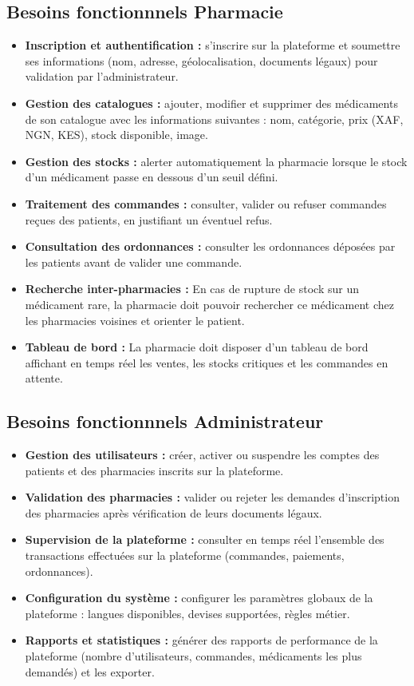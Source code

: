 \documentclass[12pt,a4paper]{report}
\begin{document}
	\subsection{Besoins fonctionnnels Pharmacie} 
	\begin{itemize} 
		\item \textbf{Inscription et authentification : } s'inscrire sur la plateforme et soumettre ses informations (nom, adresse, géolocalisation, documents légaux) pour validation par l'administrateur. 
		\item \textbf{Gestion des catalogues : }ajouter, modifier et supprimer des médicaments de son catalogue avec les informations suivantes : nom, catégorie, prix (XAF, NGN, KES), stock disponible, image. 
		\item \textbf{Gestion des stocks : }alerter automatiquement la pharmacie lorsque le stock d'un médicament passe en dessous d'un seuil défini. 
		\item \textbf{Traitement des commandes : }consulter, valider ou refuser commandes reçues des patients, en justifiant un éventuel refus. 
		\item \textbf{Consultation des ordonnances : }consulter les ordonnances déposées par les patients avant de valider une commande. 
		\item \textbf{Recherche inter-pharmacies : }En cas de rupture de stock sur un médicament rare, la pharmacie doit pouvoir rechercher ce médicament chez les pharmacies voisines et orienter le patient. 
		\item \textbf{Tableau de bord : }La pharmacie doit disposer d'un tableau de bord affichant en temps réel les ventes, les stocks critiques et les commandes en attente. 
	\end{itemize} 
	
	\subsection{Besoins fonctionnnels Administrateur} 
	\begin{itemize} 
		\item \textbf{Gestion des utilisateurs : }créer, activer ou suspendre les comptes des patients et des pharmacies inscrits sur la plateforme. 
		\item \textbf{Validation des pharmacies : }valider ou rejeter les demandes d'inscription des pharmacies après vérification de leurs documents légaux. 
		\item \textbf{Supervision de la plateforme : }consulter en temps réel l'ensemble des transactions effectuées sur la plateforme (commandes, paiements, ordonnances). 
		\item \textbf{Configuration du système : }configurer les paramètres globaux de la plateforme : langues disponibles, devises supportées, règles métier. 
		\item \textbf{Rapports et statistiques : }générer des rapports de performance de la plateforme (nombre d'utilisateurs, commandes, médicaments les plus demandés) et les exporter. 
	\end{itemize} 
	
\end{document}
